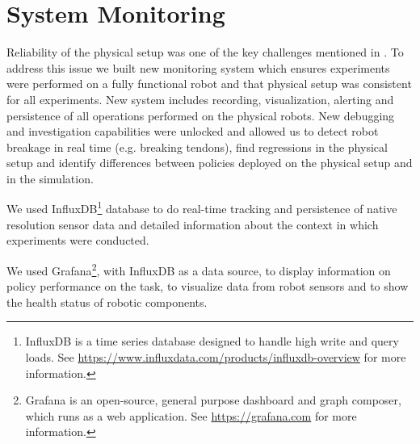 
\section{System Monitoring}
\label{app:hardware-monitoring}

Reliability of the physical setup was one of the key challenges mentioned in \cite{openai2018learning}. To address this issue we built new monitoring system which ensures experiments were performed on a fully functional robot and that physical setup was consistent for all experiments. 
New system includes recording, visualization, alerting and persistence of all operations performed on the physical robots. New debugging and investigation capabilities were unlocked and allowed us to detect robot breakage in real time (e.g. breaking tendons), find regressions in the physical setup and identify differences between policies deployed on the physical setup and in the simulation.

We used InfluxDB\footnote{InfluxDB is a time series database designed to handle high write and query loads. See \url{https://www.influxdata.com/products/influxdb-overview} for more information.} database to do real-time tracking and persistence of native resolution sensor data and detailed information about the context in which experiments were conducted.

We used Grafana\footnote{Grafana is an open-source, general purpose dashboard and graph composer, which runs as a web application. See \url{https://grafana.com} for more information.}, with InfluxDB as a data source, to display information on policy performance on the task, to visualize data from robot sensors and to show the health status of robotic components.
